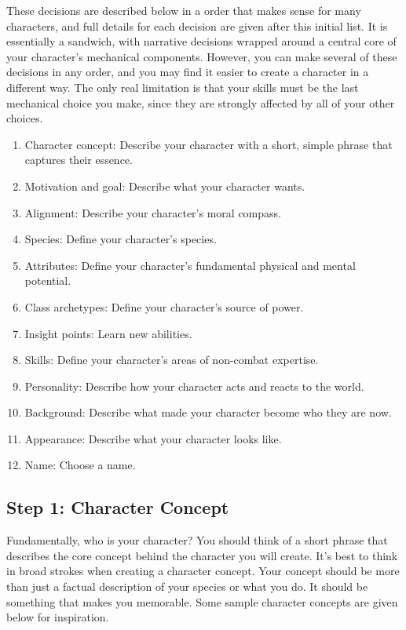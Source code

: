     These decisions are described below in a order that makes sense for many characters, and full details for each decision are given after this initial list.
    It is essentially a sandwich, with narrative decisions wrapped around a central core of your character's mechanical components.
    However, you can make several of these decisions in any order, and you may find it easier to create a character in a different way.
    The only real limitation is that your skills must be the last mechanical choice you make, since they are strongly affected by all of your other choices.

    \begin{enumerate}
        \item Character concept: Describe your character with a short, simple phrase that captures their essence.
        \item Motivation and goal: Describe what your character wants.
        \item Alignment: Describe your character's moral compass.

        \item Species: Define your character's species.
        \item Attributes: Define your character's fundamental physical and mental potential.
        \item Class archetypes: Define your character's source of power.
        \item Insight points: Learn new abilities.
        \item Skills: Define your character's areas of non-combat expertise.

        \item Personality: Describe how your character acts and reacts to the world.
        \item Background: Describe what made your character become who they are now.
        \item Appearance: Describe what your character looks like.
        \item Name: Choose a name.
    \end{enumerate}

    \subsection{Step 1: Character Concept}

        Fundamentally, who is your character?
        You should think of a short phrase that describes the core concept behind the character you will create.
        It's best to think in broad strokes when creating a character concept.
        Your concept should be more than just a factual description of your species or what you do.
        It should be something that makes you memorable.
        Some sample character concepts are given below for inspiration.

